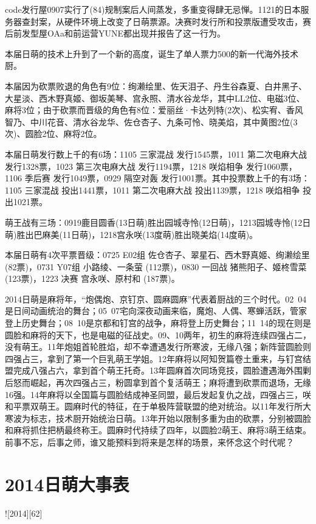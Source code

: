 code发行屋0907实行了(84)规制案后人间蒸发，多重变得肆无忌惮。1121的日本服务器查封案，从硬件环境上改变了日萌票源。决赛时发行所和投票版遭受攻击，赛后前发型屋OAa和前运营YUNE都出现并报告了这一行为。

本届日萌的技术上升到了一个新的高度，诞生了单人票力500的新一代海外技术厨。

本届因为砍票败退的角色有9位：绚濑绘里、佐天泪子、丹生谷森夏、白井黑子、大星淡、西木野真姬、御坂美琴、宫永照、清水谷龙华，其中LL2位、电磁3位、麻将3位；由于砍票而晋级的角色有8位：爱丽丝·卡达列特(2次)、松实宥、香风智乃、中川花音、清水谷龙华、佐仓杏子、九条可怜、晓美焰，其中黄图2位(3次)、圆脸2位、麻将2位。

本届日萌发行数上千的有6场：1105 三家混战 发行1545票，1011 第二次电麻大战 发行1328票，1023 第三次电麻大战 发行1194票，1218 咲焰相争 发行1060票，1106 季后赛 发行1049票，0929 隔空对轰 发行1001票。其中投票数上千的有3场：1105 三家混战 投出1441票，1011 第二次电麻大战 投出1139票，1218 咲焰相争 投出1021票。

萌王战有三场：0919鹿目圆香(13日萌)胜出园城寺怜(12日萌)，1213园城寺怜(12日萌)胜出巴麻美(11日萌)，1218宫永咲(13度萌)胜出晓美焰(14度萌)。

本届日萌有4次平票晋级：0725 E02组 佐仓杏子、翠星石、西木野真姬、绚濑绘里 (82票)，0731 Y07组 小路绫、一条萤 (112票)，0830 一回战 猪熊阳子、姬柊雪菜 (123票)，1223 决赛 宫永咲、原村和 (187票)。

2014日萌是麻将年，“炮偶炮、京钉京、圆麻圆麻”代表着厨战的三个时代。02~04是日间动画统治的舞台；05~07宅向深夜动画来临，魔炮、人偶、寒蝉活跃，管家登上历史舞台；08~10是京都和钉宫的战争，麻将登上历史舞台；11~14的现在则是圆脸和麻将的天下，也是电磁的征战史。09、10两年，初生的麻将连续四强占二，没有萌王。11年炮姐首轮胜焰，却不幸遭遇发行所寒波，无缘八强；新阵营圆脸则四强占三，拿到了第一个巨乳萌王学姐。12年麻将以阿知贺篇卷土重来，与钉宫结盟完成八强占六，拿到首个萌王托奇。13年圆麻首次同场竞技，圆脸遭遇海外围剿后怒而崛起，再次四强占三，粉圆拿到首个复活萌王；麻将遭到砍票而退场，无缘16强。14年麻将以全国篇与圆脸结成神圣同盟，最后发起复仇之战，四强占三，咲和平票双萌王。圆麻时代的特征，在于单极阵营联盟的绝对统治。以11年发行所大寒波为标志，技术厨开始统治日萌。13年开始以限制多重为由的砍票，分别被圆脸和麻将抓住把柄最终称王。圆麻时代持续了四年，以圆脸2萌王、麻将3萌王结束。前事不忘，后事之师，谁又能预料到将来是怎样的场景，来怀念这个时代呢？

\section*{2014日萌大事表}

![2014][62]
